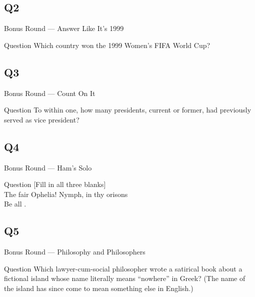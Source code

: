 \documentclass[11pt]{beamer}
\begin{document}
\subsection*{Q2}
\begin{frame}[t]{Bonus Round --- Answer Like It's 1999}
\vspace{-0.5em}
\begin{block}{Question}
Which country won the 1999 Women's FIFA World Cup?
\end{block}
\end{frame}
\subsection*{Q3}
\begin{frame}[t]{Bonus Round --- Count On It}
\vspace{-0.5em}
\begin{block}{Question}
To within one, how many presidents, current or former, had previously served as vice president?
\end{block}
\end{frame}
\subsection*{Q4}
\begin{frame}[t]{Bonus Round --- Ham's Solo}
\vspace{-0.5em}
\begin{block}{Question}
[Fill in all three blanks]\\
The fair Ophelia! Nymph, in thy orisons\\
Be all \textunderscore{}\textunderscore{}\textunderscore{}\textunderscore{}\textunderscore{} \textunderscore{}\textunderscore{}\textunderscore{}\textunderscore{}\textunderscore{} \textunderscore{}\textunderscore{}\textunderscore{}\textunderscore{}\textunderscore{}.
\end{block}
\end{frame}
\subsection*{Q5}
\begin{frame}[t]{Bonus Round --- Philosophy and Philosophers}
\vspace{-0.5em}
\begin{block}{Question}
Which lawyer-cum-social philosopher wrote a satirical book about a fictional island whose name literally means ``nowhere'' in Greek? (The name of the island has since come to mean something else in English.)
\end{block}
\end{frame}
\end{document}
